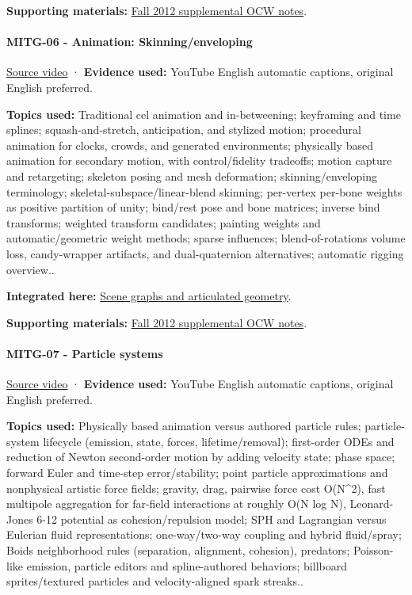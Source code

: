 \textbf{Supporting materials:} \href{https://ocw.mit.edu/courses/6-837-computer-graphics-fall-2012/pages/lecture-notes/}{Fall 2012 supplemental OCW notes}.

\paragraph{MITG-06 - Animation: Skinning/enveloping}\label{mitg-06---animation-skinningenveloping}

\href{https://www.youtube.com/watch?v=oAQkIAGKvUI}{Source video} · \textbf{Evidence used:} YouTube English automatic captions, original English preferred.

\textbf{Topics used:} Traditional cel animation and in-betweening; keyframing and time splines; squash-and-stretch, anticipation, and stylized motion; procedural animation for clocks, crowds, and generated environments; physically based animation for secondary motion, with control/fidelity tradeoffs; motion capture and retargeting; skeleton posing and mesh deformation; skinning/enveloping terminology; skeletal-subspace/linear-blend skinning; per-vertex per-bone weights as positive partition of unity; bind/rest pose and bone matrices; inverse bind transforms; weighted transform candidates; painting weights and automatic/geometric weight methods; sparse influences; blend-of-rotations volume loss, candy-wrapper artifacts, and dual-quaternion alternatives; automatic rigging overview..

\textbf{Integrated here:} \hyperref[04-visual-computing-ii-ch029]{Scene graphs and articulated geometry}.

\textbf{Supporting materials:} \href{https://ocw.mit.edu/courses/6-837-computer-graphics-fall-2012/pages/lecture-notes/}{Fall 2012 supplemental OCW notes}.

\paragraph{MITG-07 - Particle systems}\label{mitg-07---particle-systems}

\href{https://www.youtube.com/watch?v=-PGuhbZ2khE}{Source video} · \textbf{Evidence used:} YouTube English automatic captions, original English preferred.

\textbf{Topics used:} Physically based animation versus authored particle rules; particle-system lifecycle (emission, state, forces, lifetime/removal); first-order ODEs and reduction of Newton second-order motion by adding velocity state; phase space; forward Euler and time-step error/stability; point particle approximations and nonphysical artistic force fields; gravity, drag, pairwise force cost O(N\^{}2), fast multipole aggregation for far-field interactions at roughly O(N log N), Leonard-Jones 6-12 potential as cohesion/repulsion model; SPH and Lagrangian versus Eulerian fluid representations; one-way/two-way coupling and hybrid fluid/spray; Boids neighborhood rules (separation, alignment, cohesion), predators; Poisson-like emission, particle editors and spline-authored behaviors; billboard sprites/textured particles and velocity-aligned spark streaks..

